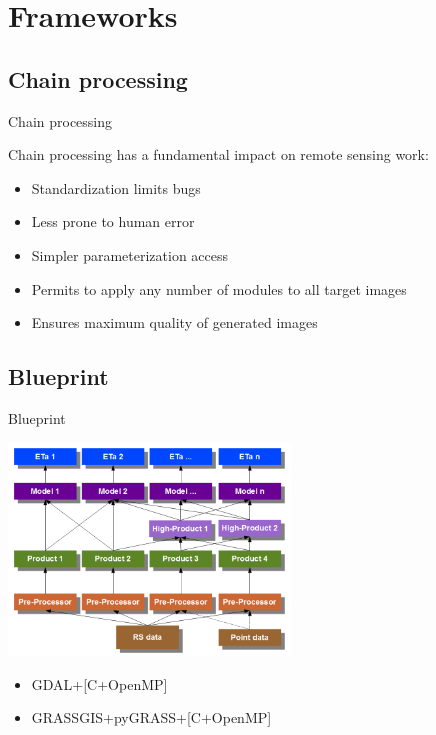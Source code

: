 \documentclass[xcolor=dvipsnames,beamer]{beamer} %
\begin{document}
\section{Frameworks}
\subsection{Chain processing}
\begin{frame}[fragile]{Chain processing}

Chain processing has a fundamental impact on remote sensing work:\\

\begin{itemize}
 \item Standardization limits bugs
 \item Less prone to human error
 \item Simpler parameterization access
 \item Permits to apply any number of modules to all target images
 \item Ensures maximum quality of generated images
\end{itemize}
\end{frame}

\subsection{Blueprint}
\begin{frame}[fragile]{Blueprint}

\begin{center}
 \includegraphics[width=7.5cm]{chain0}
\end{center}

\begin{itemize}
 \item GDAL+[C+OpenMP]
 \item GRASSGIS+pyGRASS+[C+OpenMP]
\end{itemize}
\end{frame}
\end{document}
